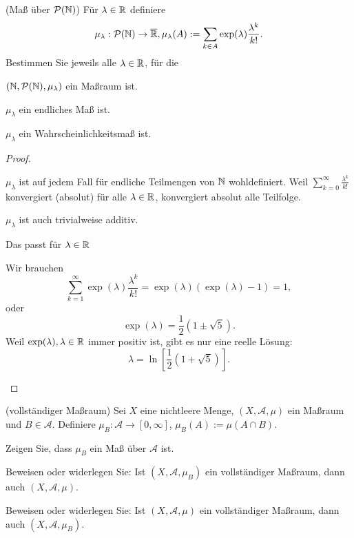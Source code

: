 \begin{Problem}
	(Maß über $\mathcal{P}(\mathbb{N})$) Für $\lambda \in \mathbb{R}$ definiere
	\[
	\mu_\lambda:\mathcal{P}(\mathbb{N})\to \overline{\mathbb{R}}, \mu_\lambda(A):=\sum_{k\in A} \exp(\lambda) \frac{\lambda^k}{k!}
	.\] 
	Bestimmen Sie jeweils alle $\lambda\in \mathbb{R}$, f\"{u}r die
	\begin{parts}
		\item $(\mathbb{N}, \mathcal{P}(\mathbb{N}), \mu_\lambda)$ ein Maßraum ist.
		\item $\mu_\lambda$ ein endliches Maß ist.
		\item $\mu_\lambda$ ein Wahrscheinlichkeitsmaß ist.
	\end{parts}
\end{Problem}
\begin{proof}
	\begin{parts}
	\item $\mu_\lambda$ ist auf jedem Fall f\"{u}r endliche Teilmengen von $\mathbb{N}$ wohldefiniert. Weil $\sum_{k=0}^\infty \frac{\lambda^k}{k!}$ konvergiert (absolut) f\"{u}r alle $\lambda\in\mathbb{R}$, konvergiert absolut alle Teilfolge. 

		$\mu_\lambda$ ist auch trivialweise additiv.
	\item Das passt f\"{u}r $\lambda \in \mathbb{R}$ 
	\item Wir brauchen 
		\[
		\sum_{k=1}^{\infty} \exp(\lambda) \frac{\lambda^k}{k!}=\exp(\lambda)(\exp(\lambda)-1)=1
		,\] 
		oder 
		\[
		\exp(\lambda)=\frac{1}{2}(1\pm \sqrt{5} )
		.\]
		Weil $\exp(\lambda), \lambda \in \mathbb{R}$ immer positiv ist, gibt es nur eine reelle Lösung:
		\[
		\lambda=\ln\left[ \frac{1}{2}\left( 1+\sqrt{5}  \right)  \right] 
		.\] 
	\end{parts}
\end{proof}
\begin{Problem}
	(vollständiger Maßraum) Sei $X$ eine nichtleere Menge, $(X, \mathcal{A}, \mu)$ ein Maßraum und $B \in \mathcal{A}$. Definiere $\mu_B : \mathcal{A} \to [0, \infty]$, $\mu_B (A) := \mu(A \cap B)$.
	\begin{parts}
	\item Zeigen Sie, dass $\mu_B$ ein Maß über $\mathcal{A}$ ist.
	\item  Beweisen oder widerlegen Sie: Ist $(X, \mathcal{A}, \mu_B)$ ein vollständiger Maßraum, dann auch $(X, \mathcal{A}, \mu)$.
	\item  Beweisen oder widerlegen Sie: Ist $(X, \mathcal{A}, \mu)$ ein vollständiger Maßraum, dann auch $(X, \mathcal{A}, \mu_B)$.
	\end{parts}
\end{Problem}
